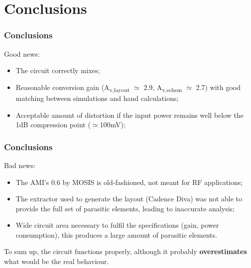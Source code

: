 \section{Conclusions}
\begin{frame}
\tableofcontents[currentsection]
\end{frame}

\begin{frame}
\frametitle{Conclusions}
Good news:
\begin{itemize}
	\item The circuit correctly mixes;
	\item Reasonable conversion gain (A\textsubscript{v,layout} $\simeq$ 2.9, A\textsubscript{v,schem} $\simeq$ 2.7) with good matching between simulations and hand calculations;
	\item Acceptable amount of distortion if the input power remains well below the 1dB compression point ($\simeq$100mV);
\end{itemize}
\end{frame}

\begin{frame}
\frametitle{Conclusions}
Bad news:
\begin{itemize}
	\item The AMI's 0.6 by MOSIS is old-fashioned, not meant for RF applications;
	\item The extractor used to generate the layout (Cadence Diva) was not able to provide the full set of parasitic elements, leading to inaccurate analysis;
	\item Wide circuit area necessary to fulfil the specifications (gain, power consumption), this produces a large amount of parasitic elements.  
\end{itemize}
To sum up, the circuit functions properly, although it probably \textbf{overestimates} what would be the real behaviour. 

\end{frame}
